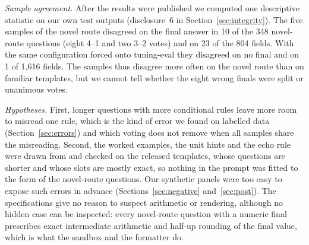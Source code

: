 \documentclass[conference]{IEEEtran}
\begin{document}
\emph{Sample agreement.} After the results were published we computed one descriptive statistic on our own test outputs (disclosure~6 in Section~\ref{sec:integrity}). The five samples of the novel route disagreed on the final answer in 10 of the 348 novel-route questions (eight 4--1 and two 3--2 votes) and on 23 of the 804 fields. With the same configuration forced onto tuning-eval they disagreed on no final and on 1 of 1,616 fields. The samples thus disagree more often on the novel route than on familiar templates, but we cannot tell whether the eight wrong finals were split or unanimous votes.

\emph{Hypotheses.} First, longer questions with more conditional rules leave more room to misread one rule, which is the kind of error we found on labelled data (Section~\ref{sec:errors}) and which voting does not remove when all samples share the misreading. Second, the worked examples, the unit hints and the echo rule were drawn from and checked on the released templates, whose questions are shorter and whose slots are mostly exact, so nothing in the prompt was fitted to the form of the novel-route questions. Our synthetic panels were too easy to expose such errors in advance (Sections~\ref{sec:negative} and~\ref{sec:post}). The specifications give no reason to suspect arithmetic or rendering, although no hidden case can be inspected: every novel-route question with a numeric final prescribes exact intermediate arithmetic and half-up rounding of the final value, which is what the sandbox and the formatter do.
\end{document}
